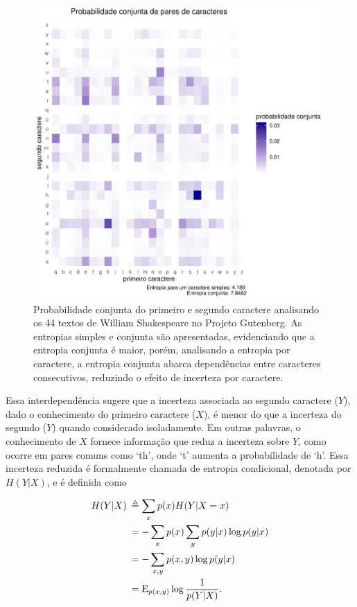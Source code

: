 \begin{figure}%
    \includegraphics[width=\linewidth]{plots/joint_probability.pdf}
    \caption{Probabilidade conjunta do primeiro e segundo caractere analisando os 44 textos de William Shakespeare no Projeto Gutenberg. As entropias simples e conjunta são apresentadas, evidenciando que a entropia conjunta é maior, porém, analisando a entropia por caractere, a entropia conjunta abarca dependências entre caracteres consecutivos, reduzindo o efeito de incerteza por caractere.}
    \label{fig:jointprobabilityshakespeare}
\end{figure}


Essa interdependência sugere que a incerteza associada ao segundo caractere
($Y$), dado o conhecimento do primeiro caractere ($X$), é menor do que a
incerteza do segundo ($Y$) quando considerado isoladamente. Em outras palavras,
o conhecimento de $X$ fornece informação que reduz a incerteza sobre $Y$, como
ocorre em pares comuns como `th', onde `t' aumenta a probabilidade de `h'. Essa
incerteza reduzida é formalmente chamada de entropia condicional, denotada por
$H(Y|X)$, e é definida como
\begin{definition}
\begin{subequations}\label{eq:entropiacondicional}
\begin{align}
 H(Y|X) \: &\triangleq \sum_x p(x) H(Y|X=x) \label{eq:entcondevents} \\
        &= - \sum_x p(x) \sum_y p(y|x) \log p(y|x) \\
	&= - \sum_{x,y} p(x,y) \log p(y|x) \label{eq:entcondsumPs}\\
	&= \E_{p(x,y)} \log \frac{1}{p(Y|X)}.
\end{align}
\end{subequations}
\end{definition}

